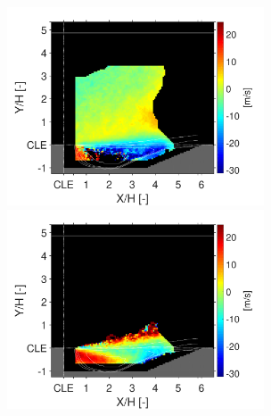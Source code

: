 \begin{figure}
        {\includegraphics[width=3in,trim=0.35in 0 0.42in 0, clip]{figures/B1/cond_statistics/B1_Uy_AVG_reactants}} \hspace{0.4cm}
        {\includegraphics[width=3in,trim=0.35in 0 0.42in 0, clip]{figures/B1/cond_statistics/B1_Uy_AVG_products}}
        \newline
        

\end{figure}

